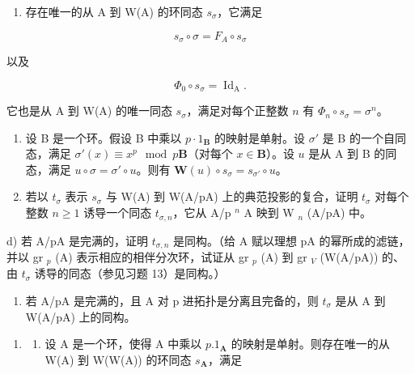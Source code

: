 \begin{enumerate}
\def\labelenumi{\alph{enumi})}
\tightlist
\item
  存在唯一的从 A 到 W(A) 的环同态 \(s_{\sigma}\)，它满足
\end{enumerate}

\[
s _ {\sigma} \circ \sigma = F _ {A} \circ s _ {\sigma}
\]

以及

\[
\Phi_ {0} \circ s _ {\sigma} = \operatorname{Id} _ {\mathrm{A}}.
\]

  它也是从 A 到 W(A) 的唯一同态 \(s_{\sigma}\)，满足对每个正整数 \(n\) 有 \(\Phi_{n} \circ s_{\sigma} = \sigma^{n}\)。

\begin{enumerate}
\def\labelenumi{\alph{enumi})}
\setcounter{enumi}{1}
\item
  设 B 是一个环。假设 B 中乘以 \(p \cdot 1_{\mathbf{B}}\) 的映射是单射。设 \(\sigma'\) 是 B 的一个自同态，满足 \(\sigma'(x) \equiv x^p \mod p\mathbf{B}\)（对每个 \(x \in \mathbf{B}\)）。设 \(u\) 是从 A 到 B 的同态，满足 \(u \circ \sigma = \sigma' \circ u\)。则有 \(\mathbf{W}(u) \circ s_{\sigma} = s_{\sigma'} \circ u\)。
\item
  若以 \(t_{\sigma}\) 表示 \(s_{\sigma}\) 与 W(A) 到 W(A/pA) 上的典范投影的复合，证明 \(t_{\sigma}\) 对每个整数 \(n \geqslant 1\) 诱导一个同态 \(t_{\sigma,n}\)，它从 A/p \(^{n}\) A 映到 W \(_{n}\) (A/pA) 中。
\end{enumerate}

d) 若 A/pA 是完满的，证明 \(t_{\sigma,n}\) 是同构。（给 A 赋以理想 pA 的幂所成的滤链，并以 gr \(_{p}\) (A) 表示相应的相伴分次环，试证从 gr \(_{p}\) (A) 到 gr \(_{V}\) (W(A/pA)) 的、由 \(t_{\sigma}\) 诱导的同态（参见习题 13）是同构。）

\begin{enumerate}
\def\labelenumi{\alph{enumi})}
\setcounter{enumi}{4}
\tightlist
\item
  若 A/pA 是完满的，且 A 对 p 进拓扑是分离且完备的，则 \(t_{\sigma}\) 是从 A 到 W(A/pA) 上的同构。
\end{enumerate}

\begin{enumerate}
\def\labelenumi{\arabic{enumi})}
\setcounter{enumi}{14}
\tightlist
\item
  \begin{enumerate}
  \def\labelenumii{\alph{enumii})}
  \tightlist
  \item
    设 A 是一个环，使得 A 中乘以 \(p.1_{\mathbf{A}}\) 的映射是单射。则存在唯一的从 W(A) 到 W(W(A)) 的环同态 \(s_{\mathbf{A}}\)，满足
  \end{enumerate}
\end{enumerate}

